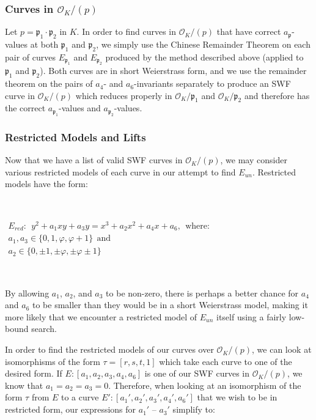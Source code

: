 \subsubsection{Curves in $\mathcal{O}_K/(p)$}

Let $p=\mathfrak{p}_1\cdot\mathfrak{p}_2$ in $K$. In order to find curves in $\mathcal{O}_K/(p)$ that have correct $a_\mathfrak{p}$-values at both $\mathfrak{p}_1$ and $\mathfrak{p}_2$, we simply use the Chinese Remainder Theorem on each pair of curves $E_{\mathfrak{p}_1}$ and $E_{\mathfrak{p}_2}$ produced by the method described above (applied to $\mathfrak{p}_1$ and $\mathfrak{p}_2$). Both curves are in short Weierstrass form, and we use the remainder theorem on the pairs of $a_4$- and $a_6$-invariants separately to produce an SWF curve in $\mathcal{O}_K/(p)$ which reduces properly in  $\mathcal{O}_K/\mathfrak{p}_1$ and  $\mathcal{O}_K/\mathfrak{p}_2$ and therefore has the correct $a_{\mathfrak{p}_1}$-values and $a_{\mathfrak{p}_2}$-values.

\subsubsection{Restricted Models and Lifts}

Now that we have a list of valid SWF curves in $\mathcal{O}_K/(p)$, we may consider various restricted models of each curve in our attempt to find $E_{un}$. Restricted models have the form:

\

$\begin{array}{l}
E_{red}: \ \ y^2 + a_1xy + a_3y = x^3 + a_2x^2 + a_4x + a_6, \ \ \text{where:} \\
a_1,a_3 \in \{0,1,\varphi,\varphi+1\} \ \ \text{and} \\
a_2 \in \{0,\pm 1,\pm \varphi, \pm \varphi \pm 1\}
\end{array}$

\

\noindent By allowing $a_1$, $a_2$, and $a_3$ to be non-zero, there is perhaps a better chance for $a_4$ and $a_6$ to be smaller than they would be in a short Weierstrass model, making it more likely that we encounter a restricted model of $E_{un}$ itself using a fairly low-bound search.

In order to find the restricted models of our curves over $\mathcal{O}_K/(p)$, we can look at isomorphisms of the form $\tau=[r,s,t,1]$ which take each curve to one of the desired form. If $E: [a_1, a_2, a_3, a_4, a_6]$ is one of our SWF curves in $\mathcal{O}_K/(p)$, we know that $a_1 = a_2 = a_3 = 0$. Therefore, when looking at an isomorphism of the form $\tau$ from $E$ to a curve $E': [a_1', a_2', a_3', a_4', a_6']$ that we wish to be in restricted form, our expressions for $a_1'$ -- $a_3'$ simplify to:

